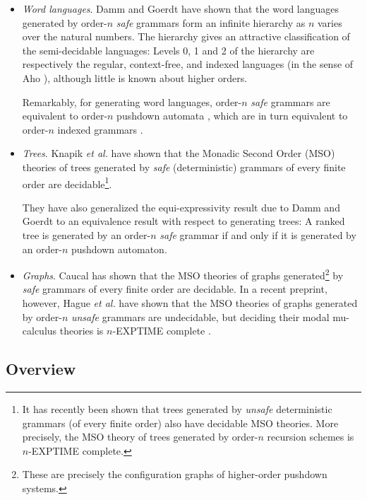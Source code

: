 \begin{itemize}
\item \emph{Word languages}. Damm and Goerdt \cite{DG86} have shown
  that the word languages generated by order-$n$ \emph{safe} grammars
  form an infinite hierarchy as $n$ varies over the natural numbers.
  The hierarchy gives an attractive classification of the
  semi-decidable languages: Levels 0, 1 and 2 of the hierarchy are
  respectively the regular, context-free, and indexed languages (in
  the sense of Aho \cite{Aho68}), although little is known about
  higher orders.

  Remarkably, for generating word languages, order-$n$ \emph{safe}
  grammars are equivalent to order-$n$ pushdown automata \cite{DG86},
  which are in turn equivalent to order-$n$ indexed grammars
  \cite{Mas74,Mas76}.

\item \emph{Trees}. Knapik \emph{et al.} have shown that the Monadic
  Second Order (MSO) theories of trees generated by \emph{safe}
  (deterministic) grammars of every finite order are
  decidable\footnote{It has recently been shown
    \cite{OngLics2006} that trees generated by \emph{unsafe}
    deterministic grammars (of every finite order) also have decidable
    MSO theories. More precisely, the MSO theory of trees generated by order-$n$
recursion schemes is $n$-EXPTIME complete.}.

  They have also generalized the equi-expressivity result due to Damm
  and Goerdt \cite{DG86} to an equivalence result with respect to
  generating trees: A ranked tree is generated by an order-$n$ \emph{safe}
  grammar if and only if it is generated by an order-$n$ pushdown
  automaton.

\item \emph{Graphs}. Caucal \cite{Cau02} has shown that the MSO
  theories of graphs generated\footnote{These are precisely the
    configuration graphs of higher-order pushdown systems.} by
  \emph{safe} grammars of every finite order are decidable. In a recent preprint, however,
  Hague \emph{et al.} have
  shown that the MSO theories of graphs generated by order-$n$
  \emph{unsafe} grammars are undecidable, but deciding their modal
  mu-calculus theories is $n$-EXPTIME complete \cite{hmos-lics08}.
\end{itemize}

\subsection*{Overview}


